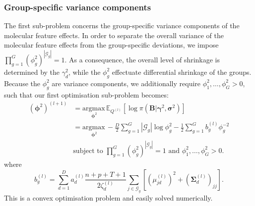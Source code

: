 \documentclass[a4paper,hidelinks]{article}\usepackage[]{graphicx}\usepackage[]{color}
\newcommand{\bsigma}{\bm{\sigma}}
\newcommand{\bSigma}{\bm{\Sigma}}
\newcommand{\bgamma}{\bm{\gamma}}
\newcommand{\B}{\mathbf{B}}
\newcommand{\0}{\bm{0}}
\newcommand{\G}{\mathcal{G}}
\newcommand{\argmax}{\text{argmax} \,}
\newcommand{\E}{\mathbb{E}}
\renewcommand{\(}{\left(}
\renewcommand{\)}{\right)}
\renewcommand{\[}{\left[}
\renewcommand{\]}{\right]}
\begin{document}
	\subsubsection{Group-specific variance components}
	The first sub-problem concerns the group-specific variance components of the molecular feature effects. In order to separate the overall variance of the molecular feature effects from the group-specific deviations, we impose $\prod_{g=1}^G (\phi_g^2)^{|\mathcal{G}_g|} = 1$. As a consequence, the overall level of shrinkage is determined by the $\gamma^2_d$, while the $\phi_g^2$ effectuate differential shrinkage of the groups. Because the $\phi_g^2$ are variance components, we additionally require $\phi^2_1, \dots, \phi^2_G> 0$, such that our first optimisation sub-problem becomes:
	\begin{align*}
	(\bm{\phi}^2)^{(l+1)} & = \underset{\bm{\phi}^2}{\argmax} \E_{Q^{(l)}} [\log \pi (\B | \bgamma^2, \bsigma^2)] \\
	& = \underset{\bm{\phi}^2}{\argmax} -\frac{D}{2} \sum_{g=1}^G |\G_g| \log \phi_g^2 - \frac{1}{2} \sum_{g=1}^G b_g^{(l)} \phi_g^{-2} \\
	& \text{subject to } \prod_{g=1}^G (\phi_g^2)^{|\G_g|} = 1 \text{ and } \phi^2_1, \dots, \phi^2_G> 0.
	\end{align*}
	where 
	$$
	b_g^{(l)}=\sum_{d=1}^D a_d^{(l)} \frac{n+p+T+1}{2\zeta_d^{(l)}} \sum_{j \in \mathcal{G}_g} \[ (\mu_{jd}^{(l)})^2 + (\bSigma_d^{(l)})_{jj} \].
	$$
	This is a convex optimisation problem and easily solved numerically.
	
\end{document}
